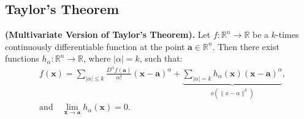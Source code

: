 \documentclass[11pt,a4paper]{article}
\theoremstyle{definition}
\theoremstyle{plain}
\newcommand{\R}{\mathbb{R}}
\begin{document}
	\subsection{Taylor's Theorem}
	\textnormal{\textbf{(Multivariate Version of Taylor's Theorem).}}
	Let $f \colon \R^n \to \R$ be a $k$-times continuously differentiable 
	function at the point $\boldsymbol{a} \in \R^n$. Then there exist functions 
	$h_\alpha \colon \R^n \to \R$, where $|\alpha| = k$, such that:
	\[
		{\begin{aligned}&f({\boldsymbol {x}})=\sum _{|\alpha |\leq k}{\frac 
		{D^{\alpha }f({\boldsymbol {a}})}{\alpha !}}({\boldsymbol {x}}-
		{\boldsymbol 
		{a}})^{\alpha }+\underbrace{\sum _{|\alpha |=k}h_{\alpha }({\boldsymbol 
		{x}})({\boldsymbol {x}}-{\boldsymbol {a}})^{\alpha }}_{o(\|x-\alpha\|
		^k)},\\&{\mbox{and}}\quad \lim _{{\boldsymbol {x}}\to {\boldsymbol {a}}}
		h_{\alpha }({\boldsymbol {x}})=0.\end{aligned}}
	\]
	
	\newpage
	
\end{document}
